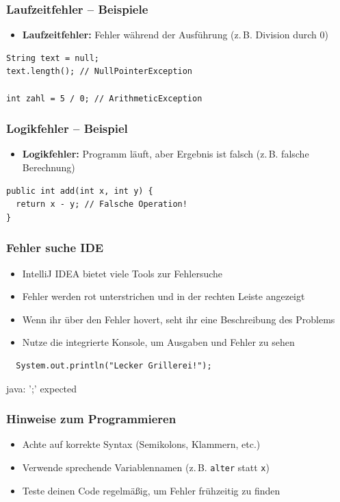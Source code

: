 \documentclass{../../presentation}
\begin{document}
\begin{frame}[fragile]
  \frametitle{Laufzeitfehler – Beispiele}
  \begin{itemize}
    \item \textbf{Laufzeitfehler:} Fehler während der Ausführung (z.\,B. Division durch 0)
  \end{itemize}
  \begin{verbatim}
String text = null;
text.length(); // NullPointerException

int zahl = 5 / 0; // ArithmeticException
  \end{verbatim}
\end{frame}

\begin{frame}[fragile]
  \frametitle{Logikfehler – Beispiel}
  \begin{itemize}
    \item \textbf{Logikfehler:} Programm läuft, aber Ergebnis ist falsch (z.\,B. falsche Berechnung)
  \end{itemize}
  \begin{verbatim}
public int add(int x, int y) {
  return x - y; // Falsche Operation!
}
  \end{verbatim}
\end{frame}

\begin{frame}[fragile]
  \frametitle{Fehler suche IDE}
  \begin{itemize}
    \item IntelliJ IDEA bietet viele Tools zur Fehlersuche
    \item Fehler werden rot unterstrichen und in der rechten Leiste angezeigt
    \item Wenn ihr über den Fehler hovert, seht ihr eine Beschreibung des Problems
    \item Nutze die integrierte Konsole, um Ausgaben und Fehler zu sehen \newline
  \end{itemize}
  \begin{verbatim}
  System.out.println("Lecker Grillerei!");
  \end{verbatim}
  \begin{ausgabe}
    \color{red}java: ';' expected
  \end{ausgabe}
\end{frame}

\begin{frame}[fragile]
  \frametitle{Hinweise zum Programmieren}
  \begin{itemize}
    \item Achte auf korrekte Syntax (Semikolons, Klammern, etc.)
    \item Verwende sprechende Variablennamen (z.\,B. \texttt{alter} statt \texttt{x})
    \item Teste deinen Code regelmäßig, um Fehler frühzeitig zu finden
  \end{itemize}
\end{frame}
\end{document}
